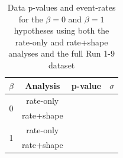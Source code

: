 \begin{table}
	\centering
	\begin{tabular}{|c|c|c|c|}
		\hline
		$\beta$				& Analysis		& p-value                		        & $\sigma$ 						           \\
		\hline
		\multirow{ 2}{*}{0} & rate-only		& \pvalRateOnlyBetaZeroDataRunOneNineD  & \sigmaRateOnlyBetaZeroDataRunOneNineD    \\
		\cline{2-4}
			   				& rate+shape	& \pvalRateShapeBetaZeroDataRunOneNineD & \sigmaRateShapeBetaZeroDataRunOneNineD   \\
		\hline
		\multirow{ 2}{*}{1} & rate-only		& \pvalRateOnlyBetaOneDataRunOneNineD   & \sigmaRateOnlyBetaOneDataRunOneNineD     \\
		\cline{2-4}
			   				& rate+shape	& \pvalRateShapeBetaOneDataRunOneNineD  & \sigmaRateShapeBetaOneDataRunOneNineD    \\
		\hline
	\end{tabular}
	\caption{Data p-values and event-rates for the $\beta = 0$ and $\beta = 1$ hypotheses using both the rate-only and rate+shape analyses and the full Run 1-9 dataset}
	\label{tab:data_pvals_R1-9d}
\end{table}

